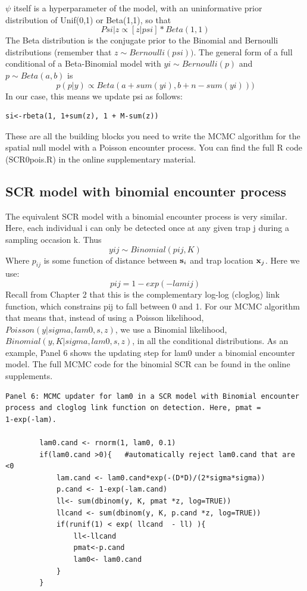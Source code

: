 $\psi$
itself is a hyperparameter of the model, with an uninformative prior distribution of Unif(0,1) or Beta(1,1), so that
\[
Psi|z \propto [z|psi] * Beta(1,1)
\]
The Beta distribution is the conjugate prior to the Binomial and Bernoulli distributions (remember that $z \sim Bernoulli(psi))$. The general form of a full conditional of a Beta-Binomial model with $yi \sim Bernoulli (p) $ and $p \sim Beta(a,b) $ is 
\[
p(p|y) \propto Beta(a + sum(yi), b + n-sum(yi)))
\]
In our case, this means we update psi as follows:
\begin{verbatim}
si<-rbeta(1, 1+sum(z), 1 + M-sum(z)) 
\end{verbatim}

These are all the building blocks you need to write the MCMC algorithm
for the spatial null model with a Poisson encounter process.  You can
find the full R code (SCR0pois.R) in the online supplementary
material.

\subsection{SCR model with binomial encounter process}
The equivalent SCR model with a binomial encounter process is very similar. Here, each individual i can only be detected once at any given trap j during a sampling occasion k. 
Thus
\[
yij \sim Binomial (pij, K)
\]
Where $p_{ij}$ is some function of distance between ${\bf s}_{i}$ and trap location ${\bf x}_{j}$. Here we use:
\[
pij=1-exp(-lamij)
\]
Recall from Chapter 2 that this is the complementary log-log (cloglog) link function, which constrains pij to fall between 0 and 1.
For our MCMC algorithm that means that, instead of using a Poisson likelihood, $Poisson(y|sigma,lam0,s,z)$, we use a Binomial likelihood, $Binomial(y,K|sigma,lam0,s,z)$, in all the conditional distributions. As an example, Panel 6 shows the updating step for lam0 under a binomial encounter model. The full MCMC code for the binomial SCR can be found in the online supplements.

{\small
\begin{verbatim}
Panel 6: MCMC updater for lam0 in a SCR model with Binomial encounter
process and cloglog link function on detection. Here, pmat =
1-exp(-lam). 

        lam0.cand <- rnorm(1, lam0, 0.1)
        if(lam0.cand >0){   #automatically reject lam0.cand that are <0
            lam.cand <- lam0.cand*exp(-(D*D)/(2*sigma*sigma))
            p.cand <- 1-exp(-lam.cand)
            ll<- sum(dbinom(y, K, pmat *z, log=TRUE))
            llcand <- sum(dbinom(y, K, p.cand *z, log=TRUE))
            if(runif(1) < exp( llcand  - ll) ){
                ll<-llcand
                pmat<-p.cand
                lam0<- lam0.cand
            }
        } 
\end{verbatim}
}

